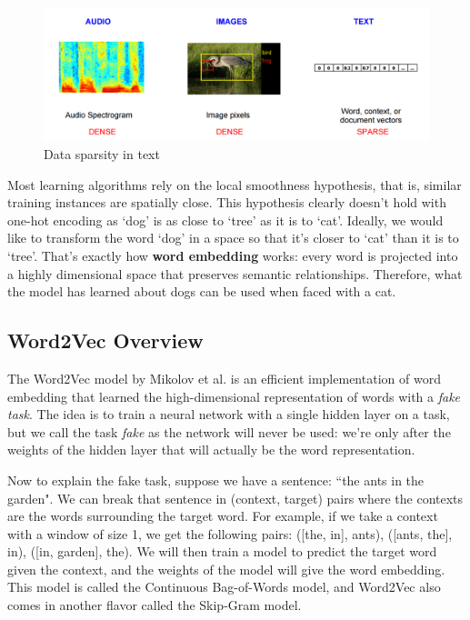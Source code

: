 \begin{figure}[H]
    \centering
    \includegraphics[width=\textwidth]{Images/comparison-text.png}
    \caption{Data sparsity in text \cite{comparison-text}}
    \label{comparison-text}
\end{figure}

Most learning algorithms rely on the local smoothness hypothesis, that is, similar training instances are spatially close. This hypothesis clearly doesn't hold with one-hot encoding as `dog' is as close to `tree' as it is to `cat'. Ideally, we would like to transform the word `dog' in a space so that it's closer to `cat' than it is to `tree'. That's exactly how \textbf{word embedding} works: every word is projected into a highly dimensional space that preserves semantic relationships. Therefore, what the model has learned about dogs can be used when faced with a cat.

\subsection{Word2Vec Overview}
The Word2Vec model by Mikolov et al. \cite{word2vec} is an efficient implementation of word embedding that learned the high-dimensional representation of words with a {\em fake task}. The idea is to train a neural network with a single hidden layer on a task, but we call the task {\em fake} as the network will never be used: we're only after the weights of the hidden layer that will actually be the word representation. 

Now to explain the fake task, suppose we have a sentence: ``the ants in the garden". We can break that sentence in (context, target) pairs where the contexts are the words surrounding the target word. For example, if we take a context with a window of size 1, we get the following pairs: ([the, in], ants), ([ants, the], in), ([in, garden], the). We will then train a model to predict the target word given the context, and the weights of the model will give the word embedding. This model is called the Continuous Bag-of-Words model, and Word2Vec also comes in another flavor called the Skip-Gram model.

